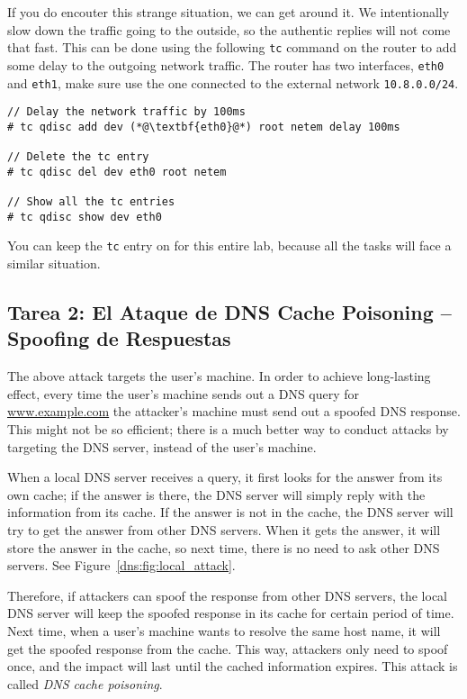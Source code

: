 If you do encouter this strange situation, we can get 
around it. We intentionally slow down the 
traffic going to the outside, so the authentic replies will not 
come that fast. This can be done using the 
following \texttt{tc} command on the router to add some 
delay to the outgoing network traffic. 
The router has two interfaces, \texttt{eth0} and 
\texttt{eth1}, make sure use the one connected 
to the external network \texttt{10.8.0.0/24}.

\begin{lstlisting}
// Delay the network traffic by 100ms
# tc qdisc add dev (*@\textbf{eth0}@*) root netem delay 100ms

// Delete the tc entry
# tc qdisc del dev eth0 root netem

// Show all the tc entries 
# tc qdisc show dev eth0
\end{lstlisting}
 

You can keep the \texttt{tc} entry on for this entire lab, because 
all the tasks will face a similar situation. 


\subsection{Tarea 2: El Ataque de DNS Cache Poisoning -- Spoofing de Respuestas}

The above attack targets the user's machine. In order to achieve long-lasting
effect, every time the user's machine sends out a DNS query for
\url{www.example.com}
the attacker's machine must send out a spoofed DNS response. 
This might not be so efficient; there is a much better way to conduct attacks 
by targeting the DNS server, instead of the user's machine.


When a local DNS server receives a query, 
it first looks 
for the answer from its own cache; if the answer is there, 
the DNS server will simply reply with the information from its cache. 
If the answer is not in the cache, the DNS server will 
try to get the answer from other DNS servers. When it gets the 
answer, it will store the answer in the cache, so next time, 
there is no need to ask other DNS servers. See Figure~\ref{dns:fig:local_attack}. 

Therefore, if attackers can spoof the response from other DNS 
servers, the local DNS server will keep the spoofed response in its cache for 
certain period of time. Next time, when a user's machine wants to resolve the 
same host name, it will get the spoofed response from the cache. 
This way, attackers only need to spoof once, and 
the impact will last until the cached information expires. 
This attack is called {\em DNS cache poisoning}.  


